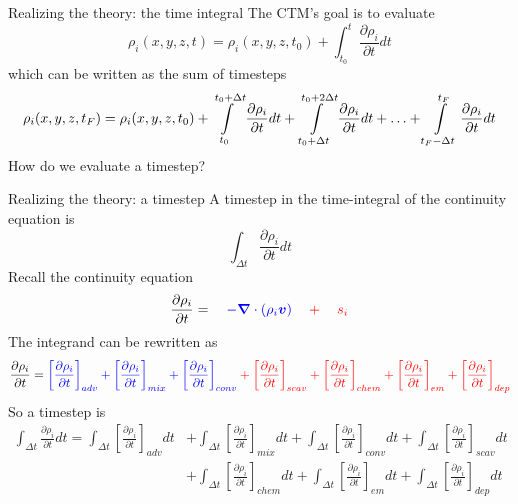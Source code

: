 \documentclass[10pt]{beamer}
\begin{document}
\begin{frame}[fragile]{Realizing the theory: the time integral}
    The CTM's goal is to evaluate
    $$
        \rho_i(x, y, z, t) = \rho_i(x, y, z, t_0) + \int_{t_0}^{t} \frac{\partial \rho_i}{\partial t} dt
    $$
    \pause
    \vfill
    which can be written as the sum of timesteps
    \small
    $$
        \rho_i(x, y, z, t_F) = \rho_i(x, y, z, t_0) + \int\displaylimits_{t_0}^{t_0 + \Delta t} \frac{\partial \rho_i}{\partial t} dt  + \int\displaylimits_{t_0 + \Delta t}^{t_0 + 2 \Delta t} \frac{\partial \rho_i}{\partial t} dt + \ldots + \int\displaylimits_{t_F - \Delta t}^{t_F} \frac{\partial \rho_i}{\partial t} dt
    $$
    \vfill
    \pause
    How do we evaluate a timestep?
\end{frame}

\begin{frame}[fragile]{Realizing the theory: a timestep}
    A timestep in the time-integral of the continuity equation is
    $$\int_{\Delta t} \frac{\partial \rho_i}{\partial t} dt$$
    Recall the continuity equation
    $$
        \frac{\partial \rho_i}{\partial t} =   \quad \color{blue} -\boldsymbol \nabla \cdot (\rho_i \boldsymbol v) \quad \color{red} + \quad s_i
    $$
    \pause
    \normalsize
    The integrand can be rewritten as
    \tiny
    $$
        \frac{\partial \rho_i}{\partial t} = 
        \color{blue}
        \left[ \frac{\partial \rho_i}{\partial t} \right]_{adv} + 
        \left[ \frac{\partial \rho_i}{\partial t} \right]_{mix} + 
        \left[ \frac{\partial \rho_i}{\partial t} \right]_{conv} \color{red} + 
        \left[ \frac{\partial \rho_i}{\partial t} \right]_{scav} + 
        \left[ \frac{\partial \rho_i}{\partial t} \right]_{chem} + 
        \left[ \frac{\partial \rho_i}{\partial t} \right]_{em} + 
        \left[ \frac{\partial \rho_i}{\partial t} \right]_{dep}
    $$
    \pause
    \normalsize
    So a timestep is
    \tiny
    \begin{align*}
        \int_{\Delta t}\frac{\partial \rho_i}{\partial t} dt = 
        \int_{\Delta t}\left[ \frac{\partial \rho_i}{\partial t} \right]_{adv} dt 
        & + \int_{\Delta t}\left[ \frac{\partial \rho_i}{\partial t} \right]_{mix} dt + 
        \int_{\Delta t}\left[ \frac{\partial \rho_i}{\partial t} \right]_{conv} dt +
        \int_{\Delta t}\left[ \frac{\partial \rho_i}{\partial t} \right]_{scav} dt \\ 
        & + \int_{\Delta t}\left[ \frac{\partial \rho_i}{\partial t} \right]_{chem} dt + 
        \int_{\Delta t}\left[ \frac{\partial \rho_i}{\partial t} \right]_{em} dt + 
        \int_{\Delta t}\left[ \frac{\partial \rho_i}{\partial t} \right]_{dep} dt
    \end{align*}
\end{frame}
\end{document}
